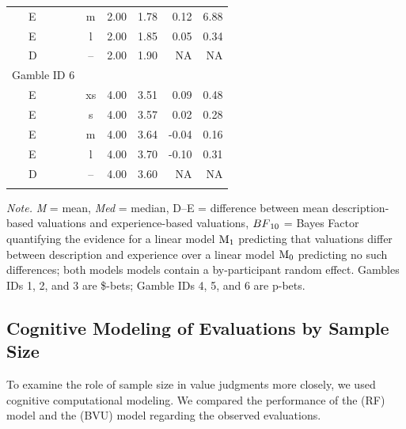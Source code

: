\documentclass[a4paper, man, floatsintext]{apa6}
\begin{document}
\begin{table}[tbp]
\begin{center}
\begin{threeparttable}
\begin{tabular}{lcccrr}
\ \ \ E & m & 2.00 & 1.78 & 0.12 & 6.88\\
\ \ \ E & l & 2.00 & 1.85 & 0.05 & 0.34\\
\ \ \ D & -- & 2.00 & 1.90 & NA & NA\\
Gamble ID 6 &  &  &  &  & \\
\ \ \ E & xs & 4.00 & 3.51 & 0.09 & 0.48\\
\ \ \ E & s & 4.00 & 3.57 & 0.02 & 0.28\\
\ \ \ E & m & 4.00 & 3.64 & -0.04 & 0.16\\
\ \ \ E & l & 4.00 & 3.70 & -0.10 & 0.31\\
\ \ \ D & -- & 4.00 & 3.60 & NA & NA\\
\bottomrule
\addlinespace
\end{tabular}
\begin{tablenotes}[para]
\normalsize{\textit{Note.} \textit{M} = mean, \textit{Med} = median, D--E = difference between mean description-based valuations and experience-based valuations, $BF\textsubscript{10}$ = Bayes Factor quantifying the evidence for a linear model $\mathrm{M}\textsubscript{1}$ predicting that valuations differ between description and experience over a linear model $\mathrm{M}\textsubscript{0}$ predicting no such differences; both models models contain a by-participant random effect. Gambles IDs 1, 2, and 3 are \$-bets; Gamble IDs 4, 5, and 6 are p-bets.}
\end{tablenotes}
\end{threeparttable}
\end{center}
\end{table}

\subsection{Cognitive Modeling of Evaluations by Sample Size}

To examine the role of sample size in value judgments more closely, we
used cognitive computational modeling. We compared the performance of
the  (RF) model and the
 (BVU) model regarding the observed
evaluations.
\end{document}
